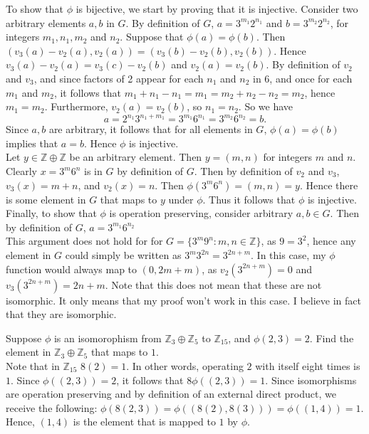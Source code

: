 \documentclass{article}
\newcommand{\Z}{\mathbb{Z}}
\begin{document}
To show that $\phi$ is bijective, we start by proving that it is injective. Consider two arbitrary elements $a,b$ in $G$. By definition of $G$, $a = 3^{m_1}2^{n_1}$ and $b = 3^{m_2}2^{n_2}$, for integers $m_1,n_1,m_2$ and $n_2$. Suppose that $\phi(a) = \phi(b)$. Then $(v_3(a)-v_2(a),v_2(a)) = (v_3(b)-v_2(b), v_2(b)).$ Hence $v_3(a)-v_2(a) = v_3(c)-v_2(b)$ and $v_2(a) = v_2(b)$. By definition of $v_2$ and $v_3$, and since factors of 2 appear for each $n_1$ and $n_2$ in 6, and once for each $m_1$ and $m_2$, it follows that $m_1 + n_1 - n_1 = m_1 = m_2 + n_2 - n_2 = m_2$, hence $m_1 = m_2$. Furthermore, $v_2(a) = v_2(b)$, so $n_1 = n_2$. So we have $$a = 2^{n_1}3^{n_1 + m_1} = 3^{m_1}6^{n_1} = 3^{m_2}6^{n_2} = b.$$ Since $a,b$ are arbitrary, it follows that for all elements in $G$, $\phi(a) = \phi(b)$ implies that $a = b$. Hence $\phi$ is injective.\\

Let $y\in \Z\oplus \Z$ be an arbitrary element. Then $y = (m,n)$ for integers $m$ and $n$. Clearly $x = 3^m6^n$ is in $G$ by definition of $G$. Then by definition of $v_2$ and $v_3$, $v_3(x) = m + n$, and $v_2(x) = n$. Then $\phi(3^m6^n) = (m, n) = y$. Hence there is some element in $G$ that maps to $y$ under $\phi$. Thus it follows that $\phi$ is injective.\\

Finally, to show that $\phi$ is operation preserving, consider arbitrary $a,b\in G$. Then by definition of $G$, $a = 3^{m_1}6^{n_2}$\\

 This argument does not hold for for $G = \{3^m9^n: m,n\in \Z\}$, as $9 = 3^2$, hence any element in $G$ could simply be written as $3^m3^{2n} = 3^{2n+m}.$ In this case, my $\phi$ function would always map to $(0,2m+m)$, as $v_2(3^{2n+m}) = 0$ and $v_3(3^{2n+m}) = 2n+m$. Note that this does not mean that these are not isomorphic. It only means that my proof won't work in this case. I believe in fact that they are isomorphic.\\

\newpage

 Suppose $\phi$ is an isomorophism from $\Z_3\oplus\Z_5$ to $\Z_{15}$, and $\phi(2,3) = 2$. Find the element in $\Z_3\oplus \Z_5$ that maps to $1$. \\

 Note that in $\Z_{15}$ $8(2) = 1$. In other words, operating $2$ with itself eight times is $1$. Since $\phi((2,3))=2$, it follows that $8\phi((2,3))=1$. Since isomorphisms are operation preserving and by definition of an external direct product, we receive the following: $\phi(8(2,3))=\phi((8(2), 8(3)))=\phi((1, 4))=1$. Hence, $(1,4)$ is the element that is mapped to $1$ by $\phi$. \\
\end{document}
